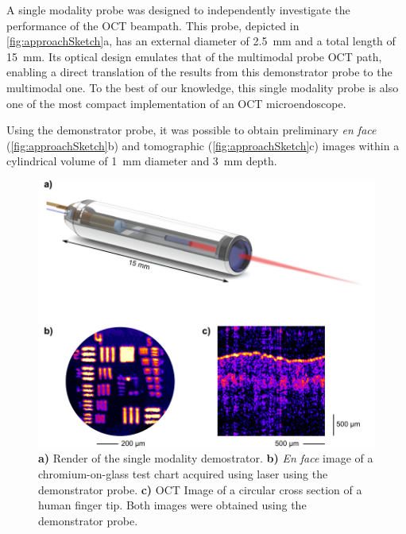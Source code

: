 A single modality probe was designed to independently investigate the performance of the OCT beampath. This probe, depicted in \autoref{fig:approachSketch}a, has an external diameter of \SI{2.5}{\milli\meter} and a total length of \SI{15}{\milli\meter}. Its optical design emulates that of the multimodal probe OCT path, enabling a direct translation of the results from this demonstrator probe to the multimodal one. To the best of our knowledge, this single modality probe is also one of the most compact implementation of an OCT microendoscope.

Using the demonstrator probe, it was possible to obtain preliminary \textit{en face} (\autoref{fig:approachSketch}b) and tomographic (\autoref{fig:approachSketch}c) images within a cylindrical volume of \SI{1}{\milli\meter} diameter and \SI{3}{\milli\meter} depth.

\begin{figure}[t]\centering
      \includegraphics{figures/10_Introduction/summary.pdf}
      \caption{\textbf{a)} Render of the single modality demostrator.
      			\textbf{b)} \textit{En face} image of a chromium-on-glass test chart acquired using laser using the demonstrator probe.
      			\textbf{c)} OCT Image of a circular cross section of a human finger tip. Both images were obtained using the demonstrator probe.
      			}
      \label{fig:approachSketch}
\end{figure}